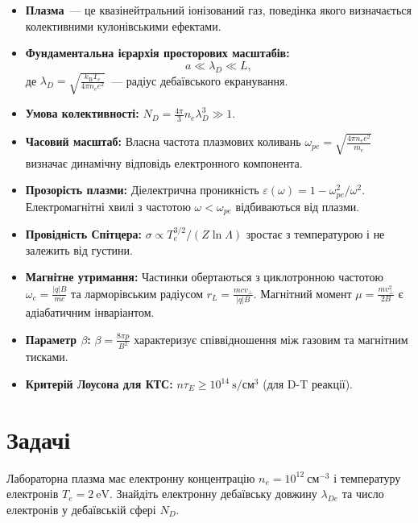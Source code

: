 \begin{itemize}
	\item \textbf{Плазма}~--- це квазінейтральний іонізований газ, поведінка якого визначається колективними кулонівськими ефектами.
	\item \textbf{Фундаментальна ієрархія просторових масштабів:}
	\begin{equation*}
		a \ll \lambda_D \ll L,
	\end{equation*}
	де $\lambda_D = \sqrt{\frac{k_{\mathrm B}T_e}{4\pi n_e e^2}}$~--- радіус дебаївського екранування.
	\item \textbf{Умова колективності:} $N_D = \frac{4\pi}{3}n_e\lambda_D^3 \gg 1$.
	\item \textbf{Часовий масштаб:} Власна частота плазмових коливань $\omega_{pe} = \sqrt{\frac{4\pi n_e e^2}{m_e}}$ визначає динамічну відповідь електронного компонента.
	\item \textbf{Прозорість плазми:} Діелектрична проникність $\varepsilon(\omega) = 1 - \omega_{pe}^2/\omega^2$. Електромагнітні хвилі з частотою $\omega < \omega_{pe}$ відбиваються від плазми.
	\item \textbf{Провідність Спітцера:} $\sigma \propto T_e^{3/2} / (Z \ln\Lambda)$ зростає з температурою і не залежить від густини.
	\item \textbf{Магнітне утримання:} Частинки обертаються з циклотронною частотою $\omega_c = \frac{|q|B}{mc}$ та ларморівським радіусом $r_L = \frac{mc v_\perp}{|q|B}$. Магнітний момент $\mu = \frac{mv_\perp^2}{2B}$ є адіабатичним інваріантом.
	\item \textbf{Параметр $\beta$:} $\beta = \frac{8\pi p}{B^2}$ характеризує співвідношення між газовим та магнітним тисками.
	\item \textbf{Критерій Лоусона для КТС:} $n \tau_E \ge 10^{14}~\mathrm{s}/\mathrm{см}^3$ (для D-T реакції).
\end{itemize}

\section*{Задачі}

\begin{problem}\label{prb:PlasmaDebye}
	 Лабораторна плазма має електронну концентрацію $n_e = 10^{12}~\mathrm{см}^{-3}$ і температуру електронів $T_e = 2~\mathrm{eV}$. Знайдіть електронну дебаївську довжину $\lambda_{De}$ та число електронів у дебаївській сфері $N_D$.
\end{problem}

